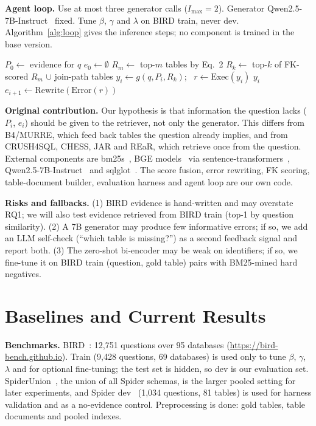\documentclass[sigconf,nonacm]{acmart}
\begin{document}
\textbf{Agent loop.} Use at most three generator calls ($I_{\max}=2$). Generator Qwen2.5-7B-Instruct~\cite{qwen} fixed. Tune $\beta$, $\gamma$ and $\lambda$ on BIRD train, never dev. Algorithm~\ref{alg:loop} gives the inference steps; no component is trained in the base version.

\begin{algorithm}[t]
\caption{State-aware retrieval inside the agent loop}\label{alg:loop}
\begin{algorithmic}[1]
\State $P_0 \gets$ evidence for $q$ 
\State $e_0 \gets \emptyset$
  \State $R_m \gets$ top-$m$ tables by Eq.~2
  \State $R_k \gets$ top-$k$ of FK-scored $R_m$ $\cup$ join-path tables
  \State $y_i \gets g(q, P_i, R_k)$; \ $r \gets \mathrm{Exec}(y_i)$
   \Return $y_i$ \EndIf
  \State $e_{i+1} \gets \mathrm{Rewrite}(\mathrm{Error}(r))$ 
\EndFor
\end{algorithmic}
\end{algorithm}

\textbf{Original contribution.} Our hypothesis is that information the question lacks ($P_i$, $e_i$) should be given to the retriever, not only the generator. This differs from B4/MURRE, which feed back tables the question already implies, and from CRUSH4SQL, CHESS, JAR and REaR, which retrieve once from the question. External components are bm25s~\cite{bm25s}, BGE models~\cite{bge} via sentence-transformers~\cite{sbert}, Qwen2.5-7B-Instruct~\cite{qwen} and sqlglot~\cite{sqlglot}. The score fusion, error rewriting, FK scoring, table-document builder, evaluation harness and agent loop are our own code.

\textbf{Risks and fallbacks.} (1) BIRD evidence is hand-written and may overstate RQ1; we will also test evidence retrieved from BIRD train (top-1 by question similarity). (2) A 7B generator may produce few informative errors; if so, we add an LLM self-check (``which table is missing?'') as a second feedback signal and report both. (3) The zero-shot bi-encoder may be weak on identifiers; if so, we fine-tune it on BIRD train (question, gold table) pairs with BM25-mined hard negatives.

\section{Baselines and Current Results}\label{sec:results}

\textbf{Benchmarks.} BIRD~\cite{bird}: 12,751 questions over 95 databases (\url{https://bird-bench.github.io}). Train (9,428 questions, 69 databases) is used only to tune $\beta$, $\gamma$, $\lambda$ and for optional fine-tuning; the test set is hidden, so dev is our evaluation set. SpiderUnion~\cite{crush}, the union of all Spider schemas, is the larger pooled setting for later experiments, and Spider dev~\cite{spider} (1,034 questions, 81 tables) is used for harness validation and as a no-evidence control. Preprocessing is done: gold tables, table documents and pooled indexes.
\end{document}
